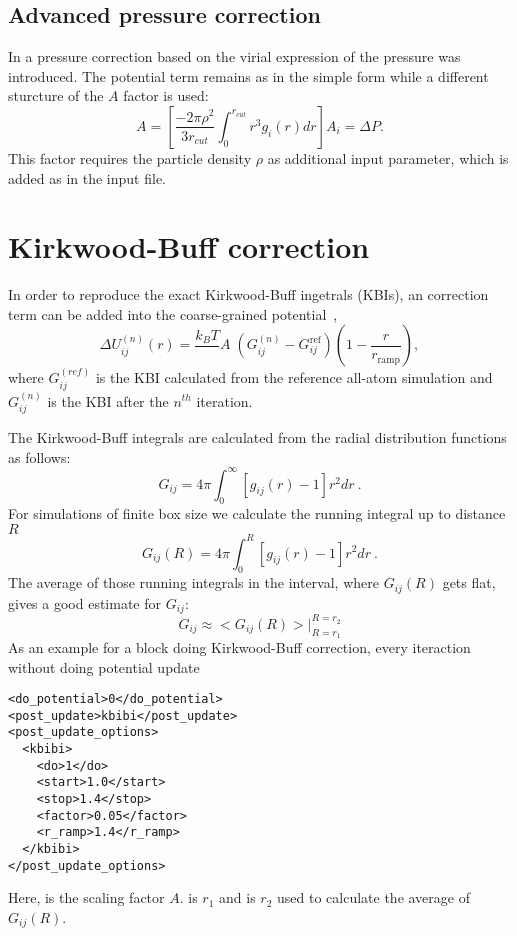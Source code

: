 \subsection{Advanced pressure correction}
In \cite{Wang:2009} a pressure correction based on the virial expression of the pressure was introduced. The potential term remains as in the simple form while a different sturcture of the $A$ factor is used:
\begin{equation}
  A = \left[\frac{-2\pi\rho^{2}}{3r_{cut}}\int_{0}^{r_{cut}}r^{3}g_{i}(r)dr\right]A_{i}=\Delta P.
\end{equation}
This factor requires the particle density $ \rho $ as additional input parameter, which is added as   in the input file.

\section{Kirkwood-Buff correction}
In order to reproduce the exact Kirkwood-Buff ingetrals (KBIs), an correction term can be added into the coarse-grained potential~\cite{Ganguly:2012},
\begin{equation}
  \Delta U_{ij}^{(n)}(r) = \frac{k_{B}T}\;A\;(G_{ij}^{(n)} - G_{ij}^\text{ref})\left(1- \frac{r}{r_\text{ramp}}\right),
\end{equation}
where $G_{ij}^{(ref)}$ is the KBI calculated from the reference all-atom simulation and $G_{ij}^{(n)}$ is the KBI 
after the $n^{th}$ iteration.

The Kirkwood-Buff integrals are calculated from the radial distribution functions as follows:
\begin{equation}
G_{ij} = 4\pi \int_0^\infty \left[ g_{ij}(r) - 1\right] r^2 dr~.
\label{eq:kbi}
\end{equation}
For simulations of finite box size we calculate the running integral up to distance $R$
\begin{equation}
  G_{ij}(R) = 4\pi \int_0^R \left[ g_{ij}(r) - 1\right] r^2 dr~.
\end{equation}
The average of those running integrals in the interval, where $G_{ij}(R)$ gets flat, gives a good estimate for $G_{ij}$:
\begin{equation}
  G_{ij}\approx<G_{ij}(R)>|_{R=r_1}^{R=r_2}
\end{equation}
As an example for a block doing Kirkwood-Buff correction, every iteraction without doing potential update
\begin{lstlisting}
<do_potential>0</do_potential>
<post_update>kbibi</post_update>
<post_update_options>
  <kbibi>
    <do>1</do>
    <start>1.0</start>
    <stop>1.4</stop>
    <factor>0.05</factor>
    <r_ramp>1.4</r_ramp>
  </kbibi>
</post_update_options>
\end{lstlisting}
Here,  is the scaling factor $A$.  is $r_1$ and  is $r_2$ used to calculate the average of $G_{ij}(R)$.
